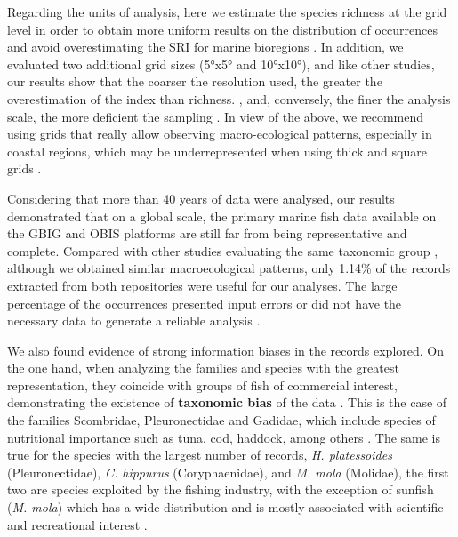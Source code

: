 \documentclass[12pt,authoryear]{elsarticle}
\begin{document}
Regarding the units of analysis, here we estimate the species richness at the grid level in order to obtain more uniform results on the distribution of occurrences and avoid overestimating the SRI for marine bioregions \citep{pelayo2018}. In addition, we evaluated two additional grid sizes (5°x5° and 10°x10°), and like other studies, our results show that the coarser the resolution used, the greater the overestimation of the index than richness. , and, conversely, the finer the analysis scale, the more deficient the sampling \citep{tittensor2010global,garcia2015,meyer2015,troia2016,troia2017}. In view of the above, we recommend using grids that really allow observing macro-ecological patterns, especially in coastal regions, which may be underrepresented when using thick and square grids \citep{pelayo2018}.

Considering that more than 40 years of data were analysed, our results demonstrated that on a global scale, the primary marine fish data available on the GBIG and OBIS platforms are still far from being representative and complete. Compared with other studies evaluating the same taxonomic group \citep{mora2008completeness,garcia2015}, although we obtained similar macroecological patterns, only 1.14\% of the records extracted from both repositories were useful for our analyses. The large percentage of the occurrences presented input errors or did not have the necessary data to generate a reliable analysis \citep{yesson2007,garcia2014}.

We also found evidence of strong information biases in the records explored. On the one hand, when analyzing the families and species with the greatest representation, they coincide with groups of fish of commercial interest, demonstrating the existence of \textbf{taxonomic bias }of the data \citep{melo2020}. This is the case of the families Scombridae, Pleuronectidae and Gadidae, which include species of nutritional importance such as tuna, cod, haddock, among others \citep{cohen1990}. The same is true for the species with the largest number of records, \textit{H. platessoides} (Pleuronectidae), \textit{C. hippurus }(Coryphaenidae), and \textit{M. mola} (Molidae), the first two are species exploited by the fishing industry, with the exception of sunfish (\textit{M. mola}) which has a wide distribution and is mostly associated with scientific and recreational interest \citep{pope2010}.
\end{document}
